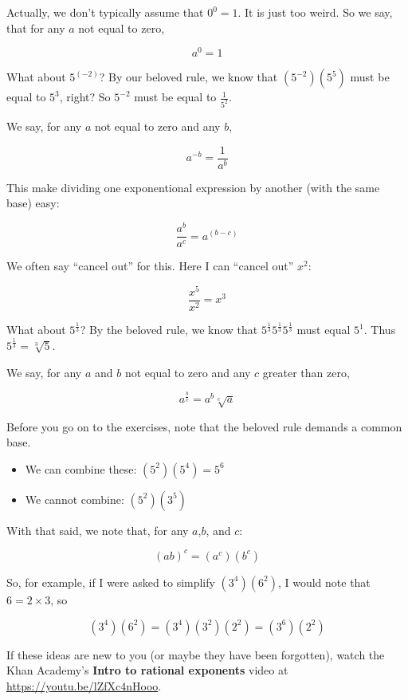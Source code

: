 Actually, we don't typically assume that $0^0 = 1$. It is just too
weird. So we say, that for any $a$ not equal to zero,

$$a^0 = 1$$

What about $5^{(-2)}$?  By our beloved rule, we know that
$\left(5^{-2}\right)\left(5^5\right)$ must be equal to $5^3$, right?
So $5^{-2}$ must be equal to $\frac{1}{5^2}$.

We say, for any $a$ not equal to zero and any $b$,

$$a^{-b} = \frac{1}{a^{b}}$$

This make dividing one exponentional expression by another (with the same base) easy:

$$\frac{a^b}{a^c} = a^{(b-c)}$$

We often say ``cancel out'' for this.  Here I can ``cancel out'' $x^2$:

$$\frac{x^5}{x^2} = x^3$$

What about $5^{\frac{1}{3}}$? By the beloved rule, we know that $5^{\frac{1}{3}}5^{\frac{1}{3}}5^{\frac{1}{3}}$ must equal $5^1$. Thus $5^{\frac{1}{3}} = \sqrt[3]{5}$.

We say, for any $a$ and $b$ not equal to zero and any $c$ greater than zero,

$$a^{\frac{b}{c}} = a^b \sqrt[c]{a}$$

Before you go on to the exercises, note that the beloved rule demands a common base.
\begin{itemize}
\item We can combine these: $\left(5^2\right)\left(5^4\right) = 5^6$
\item We cannot combine: $\left(5^2\right)\left(3^5\right)$
\end{itemize}

With that said, we note that, for any $a$,$b$, and $c$:

$$\left(ab\right)^c = \left(a^c\right) \left(b^c\right)$$

So, for example, if I were asked to simplify
$\left(3^4\right)\left(6^2\right)$, I would note that $6 = 2 \times
3$, so

$$\left(3^4\right)\left(6^2\right) = \left(3^4\right)\left(3^2\right)\left(2^2\right)  = \left(3^6\right)\left(2^2\right)$$


If these ideas are new to you (or maybe they have been forgotten),
watch the Khan Academy's \textbf{Intro to rational exponents} video at
\url{https://youtu.be/lZfXc4nHooo}.


